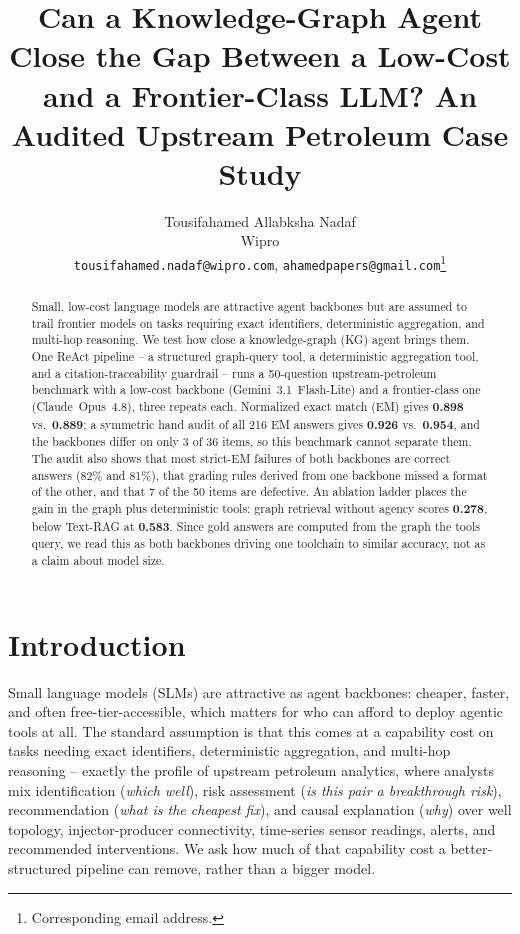 \documentclass{article}
\title{Can a Knowledge-Graph Agent Close the Gap Between a Low-Cost and a
Frontier-Class LLM? An Audited Upstream Petroleum Case Study}
\author{
  Tousifahamed Allabksha Nadaf \\
  Wipro \\
  \texttt{tousifahamed.nadaf@wipro.com}, \texttt{ahamedpapers@gmail.com}\thanks{Corresponding email address.}
}
\begin{document}
\maketitle

\begin{abstract}
Small, low-cost language models are attractive agent backbones but are assumed
to trail frontier models on tasks requiring exact identifiers, deterministic
aggregation, and multi-hop reasoning. We test how close a knowledge-graph (KG)
agent brings them. One ReAct pipeline -- a structured graph-query tool, a
deterministic aggregation tool, and a citation-traceability guardrail
-- runs a 50-question upstream-petroleum benchmark with a low-cost backbone
(Gemini~3.1~Flash-Lite) and a frontier-class one (Claude~Opus~4.8), three
repeats each. Normalized exact match (EM) gives \textbf{0.898} vs.\
\textbf{0.889}; a symmetric hand audit of all 216 EM answers gives
\textbf{0.926} vs.\ \textbf{0.954}, and the backbones differ on only 3 of 36
items, so this benchmark cannot separate them. The audit also shows that most
strict-EM failures of both backbones are correct answers (82\% and 81\%), that
grading rules derived from one backbone missed a format of the other, and that
7 of the 50 items are defective. An ablation ladder places the gain in the
graph plus deterministic tools: graph retrieval without agency scores
\textbf{0.278}, below Text-RAG at \textbf{0.583}. Since gold answers are
computed from the graph the tools query, we read this as both backbones driving
one toolchain to similar accuracy, not as a claim about model size.
\end{abstract}

\section{Introduction}

Small language models (SLMs) are attractive as agent backbones: cheaper,
faster, and often free-tier-accessible, which matters for who can afford to
deploy agentic tools at all. The standard assumption is that this comes at a
capability cost on tasks needing exact identifiers, deterministic
aggregation, and multi-hop reasoning -- exactly the profile of upstream
petroleum analytics, where analysts mix identification (\emph{which well}),
risk assessment (\emph{is this pair a breakthrough risk}), recommendation
(\emph{what is the cheapest fix}), and causal explanation (\emph{why}) over
well topology, injector-producer connectivity, time-series sensor readings,
alerts, and recommended interventions. We ask how much of that capability cost
a better-structured pipeline can remove, rather than a bigger model.
\end{document}
